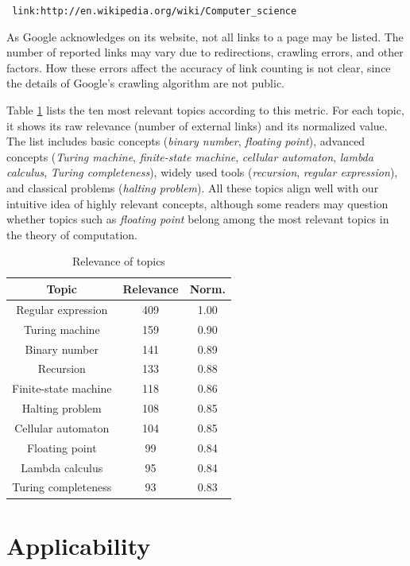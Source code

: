 \smallskip

\texttt{
link:http://en.wikipedia.org/wiki/Computer\_science
}

\smallskip

As Google acknowledges on its website, not all links to a page may be listed. The number of reported links may vary due to redirections, crawling errors, and other factors. How these errors affect the accuracy of link counting is not clear, since the details of Google's crawling algorithm are not public.

Table \ref{tab:Relevance-of-Topics} lists the ten most relevant topics according to this metric. For each topic, it shows its raw relevance (number of external links) and its normalized value. The list includes basic concepts (\emph{binary number}, \emph{floating point}), advanced concepts (\emph{Turing machine}, \emph{finite-state machine}, \emph{cellular automaton}, \emph{lambda calculus}, \emph{Turing completeness}), widely used tools (\emph{recursion}, \emph{regular expression}), and classical problems (\emph{halting problem}). All these topics align well with our intuitive idea of highly relevant concepts, although some readers may question whether topics such as \emph{floating point} belong among the most relevant topics in the theory of computation.

\begin{table}
\begin{centering}
\begin{tabular}{|c|c|c|}
\hline 
Topic & Relevance & Norm.\tabularnewline
\hline 
\hline 
Regular expression & 409 & 1.00\tabularnewline
\hline 
Turing machine & 159 & 0.90\tabularnewline
\hline 
Binary number & 141 & 0.89\tabularnewline
\hline 
Recursion & 133 & 0.88\tabularnewline
\hline 
Finite-state machine & 118 & 0.86\tabularnewline
\hline 
Halting problem & 108 & 0.85\tabularnewline
\hline 
Cellular automaton & 104 & 0.85\tabularnewline
\hline 
Floating point & 99 & 0.84\tabularnewline
\hline 
Lambda calculus & 95 & 0.84\tabularnewline
\hline 
Turing completeness & 93 & 0.83\tabularnewline
\hline 
\end{tabular}
\par\end{centering}

\caption{\label{tab:Relevance-of-Topics}Relevance of topics}
\end{table}

%
%
\section{Applicability}

